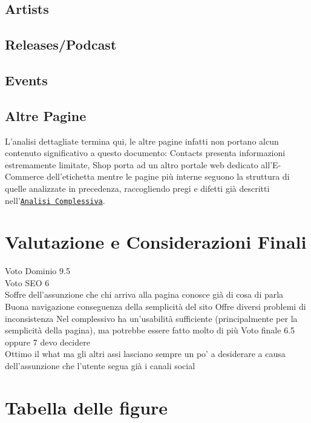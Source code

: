 \documentclass[10pt,a4paper]{article}
\begin{document}
\subsection{Artists}
\label{sec-artists}

\subsection{Releases/Podcast}

\subsection{Events}

\subsection{Altre Pagine}
L'analisi dettagliate termina qui, le altre pagine infatti non portano alcun contenuto significativo a questo documento: Contacts presenta informazioni estremamente limitate, Shop porta ad un altro portale web dedicato all'E-Commerce dell'etichetta mentre le pagine più interne seguono la struttura di quelle analizzate in precedenza, raccogliendo pregi e difetti già descritti nell'\hyperref[sec-complessiva]{\texttt{Analisi Complessiva}}.
\section{Valutazione e Considerazioni Finali}
Voto Dominio 9.5 \\
Voto SEO 6 \\
Soffre dell'assunzione che chi arriva alla pagina conosce già di cosa di parla
Buona navigazione conseguenza della semplicità del sito
Offre diversi problemi di inconsistenza
Nel complessivo ha un'usabilità sufficiente (principalmente per la semplicità della pagina), ma potrebbe essere fatto molto di più
Voto finale 6.5 oppure 7 devo decidere \\
Ottimo il what ma gli altri assi lasciano sempre un po' a desiderare a causa dell'assunzione che l'utente segua già i canali social
\appendix
\section{Tabella delle figure}
\end{document}
